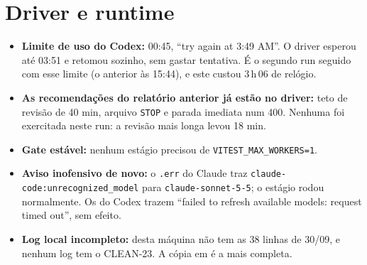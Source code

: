 \documentclass[11pt,a4paper]{article}
\begin{document}
\section{Driver e runtime}
\begin{itemize}
  \item \textbf{Limite de uso do Codex:} 00:45, ``try again at 3:49 AM''. O
        driver esperou até 03:51 e retomou sozinho, sem gastar tentativa. É o
        segundo run seguido com esse limite (o anterior às 15:44), e este
        custou 3\,h\,06 de relógio.
  \item \textbf{As recomendações do relatório anterior já estão no driver:}
        teto de revisão de 40 min, arquivo \texttt{STOP} e parada imediata num
        400. Nenhuma foi exercitada neste run: a revisão mais longa levou
        18 min.
  \item \textbf{Gate estável:} nenhum estágio precisou de
        \texttt{VITEST\_MAX\_WORKERS=1}.
  \item \textbf{Aviso inofensivo de novo:} o \texttt{.err} do Claude traz
        \texttt{claude-code:unrecognized\_model} para
        \texttt{claude-sonnet-5-5}; o estágio rodou normalmente. Os do Codex
        trazem ``failed to refresh available models: request timed out'', sem
        efeito.
  \item \textbf{Log local incompleto:}  desta
        máquina não tem as 38 linhas de 30/09, e nenhum log tem o CLEAN-23. A
        cópia em  é a mais completa.
\end{itemize}
\end{document}
